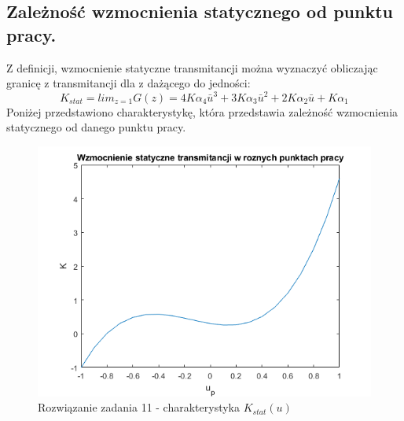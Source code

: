 \subsection{Zależność wzmocnienia statycznego od punktu pracy.}
Z definicji, wzmocnienie statyczne transmitancji można wyznaczyć obliczając granicę z transmitancji dla z dażącego do jedności:
\begin{equation}
K_{stat}=lim_{z=1}G(z) = 4K\alpha_{4}\bar{u}^3 + 3K\alpha_{3}\bar{u}^2 + 2K\alpha_{2}\bar{u} + K\alpha_{1}
\end{equation}
Poniżej przedstawiono charakterystykę, która przedstawia zależność wzmocnienia statycznego od danego punktu pracy.
\begin{figure}[H]
\centering
\includegraphics[width=15cm]{images/14.png}
\caption{Rozwiązanie zadania 11 - charakterystyka $K_{stat}(u)$}
\label{fig:14}
\end{figure}
